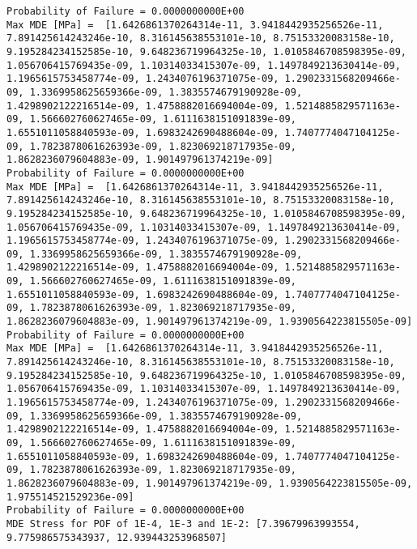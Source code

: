 \documentclass[11pt]{article}
\begin{document}
\begin{Verbatim}[commandchars=\\\{\}]
Probability of Failure = 0.0000000000E+00
Max MDE [MPa] =  [1.6426861370264314e-11, 3.9418442935256526e-11, 7.891425614243246e-10, 8.316145638553101e-10, 8.75153320083158e-10, 9.195284234152585e-10, 9.648236719964325e-10, 1.0105846708598395e-09, 1.056706415769435e-09, 1.10314033415307e-09, 1.1497849213630414e-09, 1.1965615753458774e-09, 1.2434076196371075e-09, 1.2902331568209466e-09, 1.3369958625659366e-09, 1.3835574679190928e-09, 1.4298902122216514e-09, 1.4758882016694004e-09, 1.5214885829571163e-09, 1.566602760627465e-09, 1.6111638151091839e-09, 1.6551011058840593e-09, 1.6983242690488604e-09, 1.7407774047104125e-09, 1.7823878061626393e-09, 1.823069218717935e-09, 1.8628236079604883e-09, 1.901497961374219e-09]
Probability of Failure = 0.0000000000E+00
Max MDE [MPa] =  [1.6426861370264314e-11, 3.9418442935256526e-11, 7.891425614243246e-10, 8.316145638553101e-10, 8.75153320083158e-10, 9.195284234152585e-10, 9.648236719964325e-10, 1.0105846708598395e-09, 1.056706415769435e-09, 1.10314033415307e-09, 1.1497849213630414e-09, 1.1965615753458774e-09, 1.2434076196371075e-09, 1.2902331568209466e-09, 1.3369958625659366e-09, 1.3835574679190928e-09, 1.4298902122216514e-09, 1.4758882016694004e-09, 1.5214885829571163e-09, 1.566602760627465e-09, 1.6111638151091839e-09, 1.6551011058840593e-09, 1.6983242690488604e-09, 1.7407774047104125e-09, 1.7823878061626393e-09, 1.823069218717935e-09, 1.8628236079604883e-09, 1.901497961374219e-09, 1.9390564223815505e-09]
Probability of Failure = 0.0000000000E+00
Max MDE [MPa] =  [1.6426861370264314e-11, 3.9418442935256526e-11, 7.891425614243246e-10, 8.316145638553101e-10, 8.75153320083158e-10, 9.195284234152585e-10, 9.648236719964325e-10, 1.0105846708598395e-09, 1.056706415769435e-09, 1.10314033415307e-09, 1.1497849213630414e-09, 1.1965615753458774e-09, 1.2434076196371075e-09, 1.2902331568209466e-09, 1.3369958625659366e-09, 1.3835574679190928e-09, 1.4298902122216514e-09, 1.4758882016694004e-09, 1.5214885829571163e-09, 1.566602760627465e-09, 1.6111638151091839e-09, 1.6551011058840593e-09, 1.6983242690488604e-09, 1.7407774047104125e-09, 1.7823878061626393e-09, 1.823069218717935e-09, 1.8628236079604883e-09, 1.901497961374219e-09, 1.9390564223815505e-09, 1.975514521529236e-09]
Probability of Failure = 0.0000000000E+00
MDE Stress for POF of 1E-4, 1E-3 and 1E-2: [7.39679963993554, 9.775986575343937, 12.939443253968507]

    \end{Verbatim}

    \begin{center}
    \end{center}
    { \hspace*{\fill} \\}
    
    \begin{center}
    \end{center}
    { \hspace*{\fill} \\}
    

    
    
    
    
\end{document}

